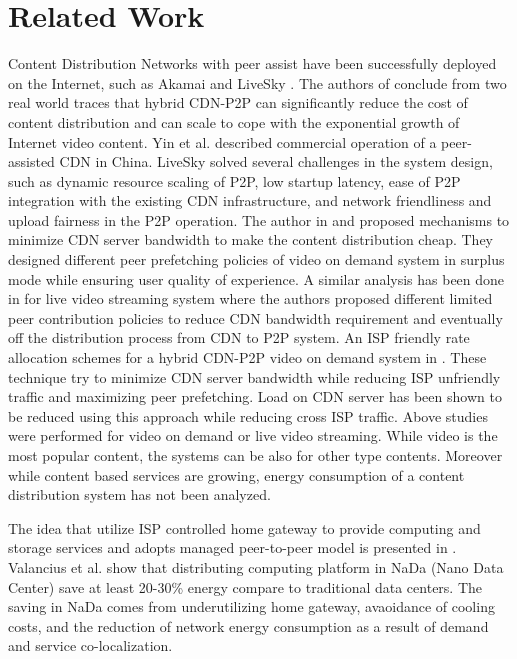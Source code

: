 \documentclass[JIP]{ipsj}
\begin{document}
\section{Related Work} 

Content Distribution Networks with peer assist have been successfully deployed on the Internet, such as Akamai \cite{Huang:2008:UHC:1496046.1496064} and LiveSky \cite{Yin:2010:LEC:1823746.1823750}.  
The authors of \cite{Huang:2008:UHC:1496046.1496064} conclude from two real world traces that hybrid CDN-P2P can significantly reduce the cost of content distribution and can scale to cope with the exponential growth of Internet video content.  
Yin et al. \cite{Yin:2010:LEC:1823746.1823750} described commercial operation of a peer-assisted CDN in China.  
LiveSky solved several challenges in the system design, such as dynamic resource scaling of P2P, low startup latency, ease of P2P integration with the existing CDN infrastructure, and network friendliness and upload fairness in the P2P operation.  
The author in \cite{Huang:2007:IVP:1282427.1282396} and \cite{huang2007peer} proposed mechanisms to minimize CDN server bandwidth to make the content distribution cheap.
They designed different peer prefetching policies of video on demand system in surplus mode while ensuring user quality of experience.
A similar analysis has been done in \cite{xu2006analysis} for live video streaming system where the authors proposed different limited peer contribution policies to reduce CDN bandwidth requirement and eventually off the distribution process from CDN to P2P system. 
An ISP friendly rate allocation schemes for a hybrid CDN-P2P video on demand system in \cite{Wang:2008:IRA:1459359.1459397}. 
These technique try to minimize CDN server bandwidth while reducing ISP unfriendly traffic and maximizing peer prefetching.
Load on CDN server has been shown to be reduced using this approach while reducing cross ISP traffic.
Above studies were performed for video on demand or live video streaming.
While video is the most popular content, the systems can be also for other type contents.
Moreover while content based services are growing, energy consumption of a content distribution system has not been analyzed.

The idea that utilize ISP controlled home gateway to provide computing and storage services and adopts managed peer-to-peer model is presented in \cite{valancius2009greening}. 
Valancius et al. \cite{valancius2009greening} show that distributing computing platform in NaDa (Nano Data Center) save at least 20-30\% energy compare to traditional data centers.
The saving in NaDa comes from underutilizing home gateway, avaoidance of cooling costs, and the reduction of network energy consumption as a result of demand and service co-localization.
\end{document}

